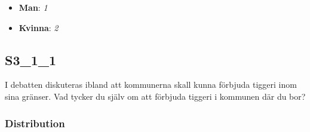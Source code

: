 \documentclass[]{book}
\providecommand{\tightlist}{%
  \setlength{\itemsep}{0pt}\setlength{\parskip}{0pt}}
\begin{document}
\begin{itemize}
\tightlist
\item
  \textbf{Man}: \emph{1}
\item
  \textbf{Kvinna}: \emph{2}
\end{itemize}

\subsection{S3\_1\_1}\label{S3_1_1}

I debatten diskuteras ibland att kommunerna skall kunna förbjuda tiggeri
inom sina gränser. Vad tycker du själv om att förbjuda tiggeri i
kommunen där du bor?

\subsubsection{Distribution}\label{S3_1_1_distribution}
\end{document}
